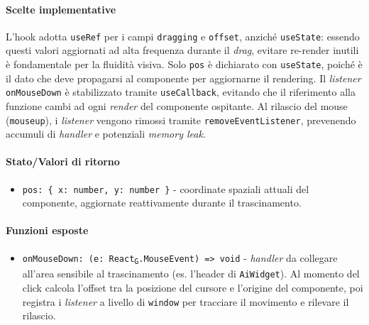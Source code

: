 \documentclass[11pt,a4paper]{article}
\newcommand{\gls}[1]{#1\textsubscript{G}}
\begin{document}
\paragraph{Scelte implementative}
L'hook adotta \texttt{useRef} per i campi \texttt{dragging} e \texttt{offset}, anziché \texttt{useState}: essendo questi valori aggiornati ad alta frequenza durante il \textit{drag}, evitare re-render inutili è fondamentale per la fluidità visiva. Solo \texttt{pos} è dichiarato con \texttt{useState}, poiché è il dato che deve propagarsi al componente per aggiornarne il rendering. Il \textit{listener} \texttt{onMouseDown} è stabilizzato tramite \texttt{useCallback}, evitando che il riferimento alla funzione cambi ad ogni \textit{render} del componente ospitante. Al rilascio del mouse (\texttt{mouseup}), i \textit{listener} vengono rimossi tramite \texttt{removeEventListener}, prevenendo accumuli di \textit{handler} e potenziali \textit{memory leak}.

\paragraph{Stato/Valori di ritorno}
\begin{itemize}
    \item \texttt{pos: \{ x: number, y: number \}} - coordinate spaziali attuali del componente, aggiornate reattivamente durante il trascinamento.
\end{itemize}

\paragraph{Funzioni esposte}
\begin{itemize}
    \item \texttt{onMouseDown: (e: \gls{React}.MouseEvent) => void} - \textit{handler} da collegare all'area sensibile al trascinamento (es. l'header di \texttt{AiWidget}). Al momento del click calcola l'offset tra la posizione del cursore e l'origine del componente, poi registra i \textit{listener} a livello di \texttt{window} per tracciare il movimento e rilevare il rilascio.
\end{itemize}


\newpage
\end{document}
